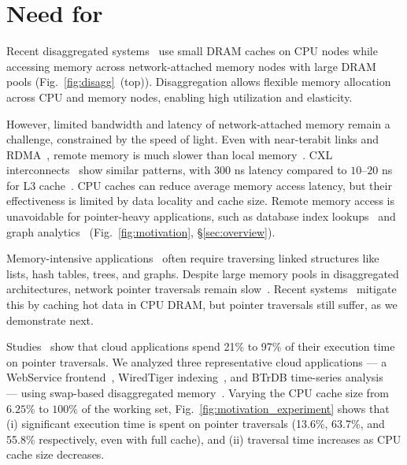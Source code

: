 

\section{Need for \pulse}
\label{sec:needforpulse}


Recent disaggregated systems~\cite{legoos, mind} use small DRAM caches on CPU nodes while accessing memory across network-attached memory nodes with large DRAM pools (Fig.~\ref{fig:disagg}~(top)). Disaggregation allows flexible memory allocation across CPU and memory nodes, enabling high utilization and elasticity.

However, limited bandwidth and latency of network-attached memory remain a challenge, constrained by the speed of light. Even with near-terabit links and RDMA~\cite{rdmalatency}, remote memory is much slower than local memory~\cite{disagg}. CXL interconnects~\cite{cxl} show similar patterns, with $300$ ns latency compared to $10$--$20$ ns for L3 cache~\cite{pond}. CPU caches can reduce average memory access latency, but their effectiveness is limited by data locality and cache size. Remote memory access is unavoidable for pointer-heavy applications, such as database index lookups~\cite{hash1, hash2, hash3, succinct, trie2, btree1, btree2, trie1, blowfish, trie3, surf} and graph analytics~\cite{powergraph, graphx, graphchi, pagerank} (Fig.~\ref{fig:motivation}, \S\ref{sec:overview}).

Memory-intensive applications~\cite{scuba, cachelib, tao, memcache, flighttracker, twittercache, spark} often require traversing linked structures like lists, hash tables, trees, and graphs. Despite large memory pools in disaggregated architectures, network pointer traversals remain slow~\cite{disagg}. Recent systems~\cite{disagg, legoos, mind, infiniswap, fastswap} mitigate this by caching hot data in CPU DRAM, but pointer traversals still suffer, as we demonstrate next.

 Studies~\cite{graphchi, monetdb, spark, voltdb, memc3, db1000, memcached} show that cloud applications spend 21\% to 97\% of their execution time on pointer traversals. We analyzed three representative cloud applications — a WebService frontend~\cite{aifm}, WiredTiger indexing~\cite{wiredtiger}, and BTrDB time-series analysis~\cite{btrdb} — using swap-based disaggregated memory~\cite{infiniswap}. Varying the CPU cache size from $6.25\%$ to $100\%$ of the working set, Fig.~\ref{fig:motivation_experiment} shows that (i) significant execution time is spent on pointer traversals (13.6\%, 63.7\%, and 55.8\% respectively, even with full cache), and (ii) traversal time increases as CPU cache size decreases.

